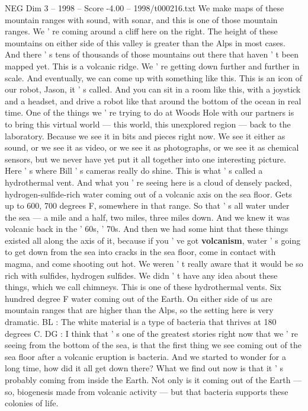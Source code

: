 \begin{textsample}{NEG Dim 3 – 1998 – Score -4.00 – 1998/t000216.txt}
We make maps of these mountain ranges with sound, with sonar, and this is one of those mountain ranges.
We ' re coming around a cliff here on the right.
The height of these mountains on either side of this valley is greater than the Alps in most cases.
And there ' s tens of thousands of those mountains out there that haven ' t been mapped yet.
This is a volcanic ridge.
We ' re getting down further and further in scale.
And eventually, we can come up with something like this.
This is an icon of our robot, Jason, it ' s called.
And you can sit in a room like this, with a joystick and a headset, and drive a robot like that around the bottom of the ocean in real time.
One of the things we ' re trying to do at Woods Hole with our partners is to bring this virtual world — this world, this unexplored region — back to the laboratory.
Because we see it in bits and pieces right now.
We see it either as sound, or we see it as video, or we see it as photographs, or we see it as chemical sensors, but we never have yet put it all together into one interesting picture.
Here ' s where Bill ' s cameras really do shine.
This is what ' s called a hydrothermal vent.
And what you ' re seeing here is a cloud of densely packed, hydrogen-sulfide-rich water coming out of a volcanic axis on the sea floor.
Gets up to 600, 700 degrees F, somewhere in that range.
So that ' s all water under the sea — a mile and a half, two miles, three miles down.
And we knew it was volcanic back in the ' 60s, ' 70s.
And then we had some hint that these things existed all along the axis of it, because if you ' ve got \textbf{volcanism}, water ' s going to get down from the sea into cracks in the sea floor, come in contact with magma, and come shooting out hot.
We weren ' t really aware that it would be so rich with sulfides, hydrogen sulfides.
We didn ' t have any idea about these things, which we call chimneys.
This is one of these hydrothermal vents.
Six hundred degree F water coming out of the Earth.
On either side of us are mountain ranges that are higher than the Alps, so the setting here is very dramatic.
BL : The white material is a type of bacteria that thrives at 180 degrees C.
DG : I think that ' s one of the greatest stories right now that we ' re seeing from the bottom of the sea, is that the first thing we see coming out of the sea floor after a volcanic eruption is bacteria.
And we started to wonder for a long time, how did it all get down there?
What we find out now is that it ' s probably coming from inside the Earth.
Not only is it coming out of the Earth — so, biogenesis made from volcanic activity — but that bacteria supports these colonies of life.

\end{textsample}
